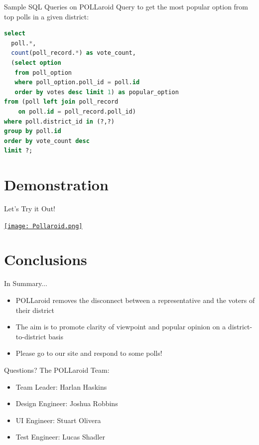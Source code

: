 \documentclass[11pt,aps,prb,groupedaddress,nofootinbib,floatfix]{beamer}
\newcommand{\pollaroid}{POLLaroid}
\begin{document}
%
%
\begin{frame}[fragile]{Sample SQL Queries on \pollaroid{}}
Query to get the most popular option from top polls  in a given district:
\begin{lstlisting}[language=SQL,basicstyle=\small]
select
  poll.*,
  count(poll_record.*) as vote_count,
  (select option
   from poll_option
   where poll_option.poll_id = poll.id
   order by votes desc limit 1) as popular_option
from (poll left join poll_record
    on poll.id = poll_record.poll_id)
where poll.district_id in (?,?)
group by poll.id
order by vote_count desc
limit ?;
\end{lstlisting}
\end{frame}

\section{Demonstration}


%
%
\begin{frame}[t]{Let's Try it Out!}
\begin{center}
\href{https://pollaroid.club/}{\texttt{[image: Pollaroid.png]}}
\end{center}
\end{frame}

\section{Conclusions}


%
%
\begin{frame}{In Summary...}
\begin{itemize}
	\item \pollaroid{} removes the disconnect between a representative and the voters of their district
	\item The aim is to promote clarity of viewpoint and popular opinion on a district-to-district basis
	\item Please go to our site and respond to some polls!
\end{itemize}
\end{frame}

\begin{frame}{Questions?}
The \pollaroid{} Team:
\begin{itemize}
	\item Team Leader: Harlan Haskins
	\item Design Engineer: Joshua Robbins
	\item UI Engineer: Stuart Olivera
	\item Test Engineer: Lucas Shadler
\end{itemize}
\end{frame}
\end{document}
